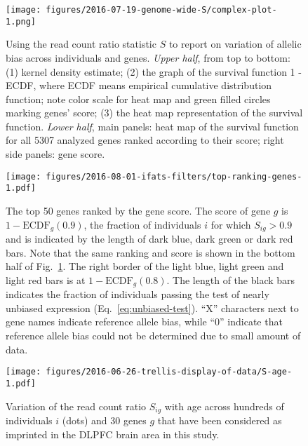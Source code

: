 \documentclass[letterpaper]{article}
\begin{document}
\begin{figure}[h]
\begin{center}
\texttt{[image: figures/2016-07-19-genome-wide-S/complex-plot-1.png]}
\end{center}
\caption{
Using the read count ratio statistic \(S\) to report on variation of allelic
bias across individuals and genes.  \emph{Upper half}, from top to bottom: (1)
kernel density estimate; (2) the graph of the survival function 1 - ECDF,
where ECDF means empirical cumulative distribution function; note color scale
for heat map and green filled circles marking genes' score; (3) the heat map
representation of the survival function.  \emph{Lower half}, main panels: heat
map of the survival function for all 5307 analyzed genes ranked according to
their score; right side panels: gene score.
}
\label{fig:ranking-genes}
\end{figure}

\begin{figure}[h]
\begin{center}
\texttt{[image: figures/2016-08-01-ifats-filters/top-ranking-genes-1.pdf]}
\caption{
The top 50 genes ranked by the gene score.  The score of gene \(g\) is \(1 -
\mathrm{ECDF}_g(0.9)\), the fraction of individuals \(i\) for which
\(S_{ig}>0.9\) and is indicated by the length of dark blue, dark green or dark
red bars.  Note that the same ranking and score is shown in the bottom half of
Fig.~\ref{fig:ranking-genes}.  The right border of the light blue, light green
and light red bars is at \(1 - \mathrm{ECDF}_g(0.8)\).  The length of the
black bars indicates the fraction of individuals passing the test of nearly
unbiased expression (Eq.~\ref{eq:unbiased-test}).  ``X'' characters next to
gene names indicate reference allele bias, while ``0'' indicate that
reference allele bias could not be determined due to small amount of data.
}
\label{fig:top-genes}
\end{center}
\end{figure}

\begin{figure}[h]
\begin{center}
\texttt{[image: figures/2016-06-26-trellis-display-of-data/S-age-1.pdf]}
\caption{
Variation of the read count ratio \(S_{ig}\) with age across hundreds of individuals
\(i\) (dots) and 30 genes \(g\) that have been considered as imprinted in the DLPFC
brain area in this study.
}
\label{fig:S-age}
\end{center}
\end{figure}
\end{document}
